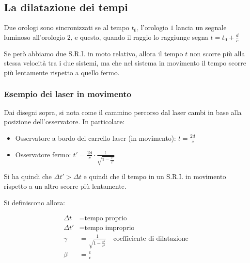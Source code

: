 
\subsection{La dilatazione dei tempi}

Due orologi sono sincronizzati se al tempo $t_0$, l'orologio $1$ lancia un segnale luminoso all'orologio $2$, e questo, quando il raggio lo raggiunge segna $t = t_0 + \frac{d}{c}$


Se però abbiamo due S.R.I. in moto relativo, allora il tempo $t$ non scorre più alla stessa velocità tra i due sistemi, ma che nel sistema in movimento il tempo scorre più lentamente rispetto a quello fermo.

\subsubsection{Esempio dei laser in movimento}


Dai disegni sopra, si nota come il cammino percorso dal laser cambi in base alla posizione dell'osservatore.
In particolare:

\begin{itemize}
    \item Osservatore a bordo del carrello laser (in movimento): $t = \frac{2d}{c}$
    \item Osservatore fermo: $t' = \frac{2d}{c} \cdot \frac{1}{\sqrt{1-\frac{v^2}{c^2}}}$
\end{itemize}

Si ha quindi che $\Delta t' > \Delta t$ e quindi che il tempo in un S.R.I. in movimento rispetto a un altro scorre più lentamente.

Si definiscono allora:

\begin{align*}
    \Delta t  & = \text{tempo proprio}                                                        \\
    \Delta t' & = \text{tempo improprio}                                                      \\
    \gamma    & = \frac{1}{\sqrt{1-\frac{v^2}{c^2}}} \quad \text{coefficiente di dilatazione} \\
    \beta     & = \frac{v}{c}
\end{align*}

